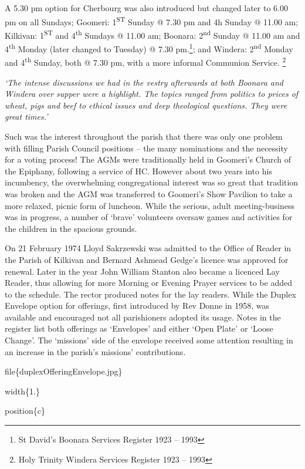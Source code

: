 A 5.30 pm option for Cherbourg was also introduced but changed later to 6.00 pm on all Sundays; Goomeri: 1\textsuperscript{ST} Sunday @ 7.30 pm and 4h Sunday @ 11.00 am; Kilkivan: 1\textsuperscript{ST} and 4\textsuperscript{th} Sundays @ 11.00 am; Boonara: 2\textsuperscript{nd} Sunday @ 11.00 am and 4\textsuperscript{th} Monday (later changed to Tuesday) @ 7.30 pm.\footnote{St David's Boonara Services Register 1923 -- 1993}; and Windera: 2\textsuperscript{nd} Monday and 4\textsuperscript{th} Sunday, both @ 7.30 pm, with a more informal Communion Service. \footnote{Holy Trinity Windera Services Register 1923 -- 1993}

\emph{`The intense discussions we had in the vestry afterwards at both Boonara and Windera over supper were a highlight. The topics ranged from politics to prices of wheat, pigs and beef to ethical issues and deep theological questions. They were great times.'}

Such was the interest throughout the parish that there was only one problem with filling Parish Council positions -- the many nominations and the necessity for a voting process! The AGMs were traditionally held in Goomeri's Church of the Epiphany, following a service of HC. However about two years into his incumbency, the overwhelming congregational interest was so great that tradition was broken and the AGM was transferred to Goomeri's Show Pavilion to take a more relaxed, picnic form of luncheon. While the serious, adult meeting-business was in progress, a number of `brave' volunteers oversaw games and activities for the children in the spacious grounds.

On 21 February 1974 Lloyd Sakrzewski was admitted to the Office of Reader in the Parish of Kilkivan and Bernard Ashmead Gedge's licence was approved for renewal. Later in the year John William Stanton also became a licenced Lay Reader, thus allowing for more Morning or Evening Prayer services to be added to the schedule. The rector produced notes for the lay readers. While the Duplex Envelope option for offerings, first introduced by Rev Donne in 1958, was available and encouraged not all parishioners adopted its usage. Notes in the register list both offerings as `Envelopes' and either `Open Plate' or `Loose Change'. The `missions' side of the envelope received some attention resulting in an increase in the parish's missions' contributions.

file\{duplexOfferingEnvelope.jpg\}

width\{1.\}

position\{c\}

